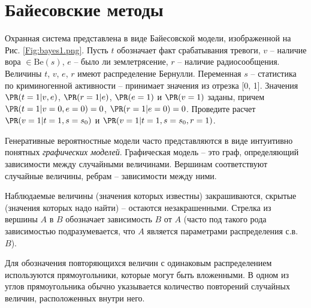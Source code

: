 \section{Байесовские методы}
\label{bayes}

\begin{problem}
Охранная система представлена в виде Байесовской модели, изображенной на Рис. \ref{Fig:bayes1.png}. 
Пусть $t$ обозначает факт срабатывания тревоги, $v$ -- наличие вора $\in \text{Be}(s)$, $e$ -- было ли землетрясение, $r$ -- наличие радиосообщения. Величины $t$, $v$, $e$, $r$ имеют распределение Бернулли. Переменная $s$ -- статистика по криминогенной активности -- принимает значения из отрезка [0, 1]. Значения $\PR(t = 1|v,e)$, $\PR(r = 1|e)$, $\PR(e = 1)$ и $\PR(v = 1)$ заданы, причем $\PR(t = 1|v=0,e=0) = 0$, $\PR(r = 1|e = 0) = 0$.
Проведите расчет $\PR(v = 1|t = 1, s = s_0)$ и $\PR(v = 1 | t = 1, s=s_0, r = 1)$. 
\end{problem}

\begin{remark}
Генеративные вероятностные модели часто представляются в виде интуитивно понятных  \textit{графических моделей}. Графическая модель -- это граф, определяющий зависимости между случайными величинами. Вершинам соответствуют случайные величины, ребрам -- зависимости между ними.

Наблюдаемые величины (значения которых известны) закрашиваются, скрытые (значения которых надо найти) -- остаются незакрашенными. Стрелка из вершины $A$ в $B$  обозначает зависимость $B$ от $A$ (часто под такого рода зависимостью подразумевается, что $A$ является параметрами распределения с.в. $B$).

Для обозначения повторяющихся величин с одинаковым распределением используются прямоугольники, которые могут быть вложенными. В одном из углов прямоугольника обычно указывается количество повторений случайных величин, расположенных внутри него. 

\end{remark}

